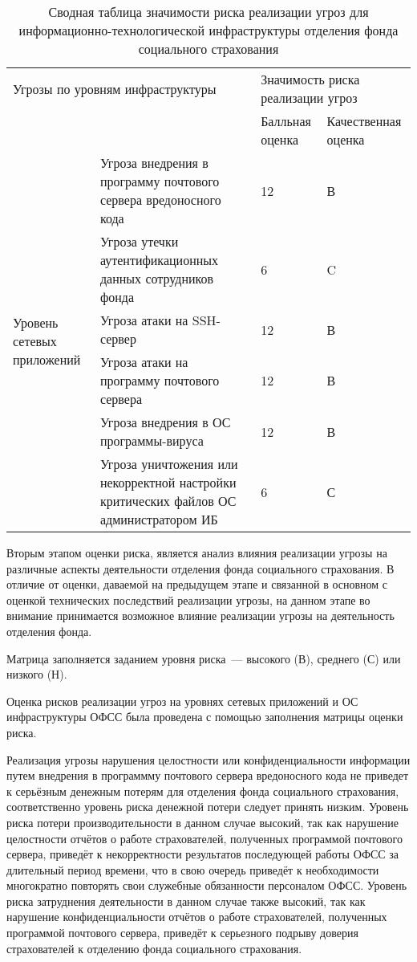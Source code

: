 \begin{table}[h]
  \caption{Сводная таблица значимости риска реализации угроз для информационно-технологической инфраструктуры отделения фонда социального страхования}
  \label{tab:res_risk}
\small
  \begin{tabular}{|p{2.5cm}|p{7cm}|p{2cm}|p{2cm}|}
    \hline
    \multicolumn{2}{|p{9.5cm}}{Угрозы по уровням инфраструктуры} &
    \multicolumn{2}{|p{5cm}|}{Значимость риска реализации угроз}\\\cline{3-4}
    \multicolumn{2}{|p{9.5cm}|}{} & Балльная оценка & Качественная оценка\\\hline
    \multirow{7}{2.5cm}{Уровень сетевых приложений} & Угроза внедрения в программу почтового сервера вредоносного
    кода & 12 & В \\\cline{2-4}
    & Угроза утечки аутентификационных данных сотрудников фонда & 6 &
    C \\\cline{2-4}
    & Угроза атаки на SSH-сервер & 12 & В \\\cline{2-4}
    & Угроза атаки на программу почтового сервера & 12 & В
    \\\hline
    \multirow{5}{2.5cm}{Уровень операционных систем} & Угроза
    внедрения в ОС программы-вируса & 12 & В \\\cline{2-4}
    & Угроза уничтожения или некорректной настройки критических файлов
  ОС администратором ИБ & 6 & С \\\hline
  \end{tabular}
\end{table}
\normalsize

\point Вторым этапом оценки риска, является анализ влияния реализации
угрозы на различные аспекты деятельности отделения фонда социального
страхования.  В отличие от оценки, даваемой на предыдущем этапе и
связанной в основном с оценкой технических последствий реализации
угрозы, на данном этапе во внимание принимается возможное влияние
реализации угрозы на деятельность отделения фонда.

Матрица заполняется заданием уровня риска~--- высокого (В), среднего
(С) или низкого (Н).

\point Оценка рисков реализации угроз на уровнях сетевых приложений и
ОС инфраструктуры ОФСС была проведена с помощью заполнения матрицы
оценки риска.

\point Реализация угрозы нарушения целостности или конфиденциальности
информации путем внедрения в программму почтового сервера вредоносного
кода не приведет к серьёзным денежным потерям для отделения фонда
социального страхования, соответственно уровень риска денежной потери
следует принять низким. Уровень риска потери производительности в
данном случае высокий, так как нарушение целостности отчётов о работе
страхователей, полученных программой почтового сервера, приведёт к
некорректности результатов последующей работы ОФСС за длительный
период времени, что в свою очередь приведёт к необходимости
многократно повторять свои служебные обязанности персоналом
ОФСС. Уровень риска затруднения деятельности в данном случае также
высокий, так как нарушение конфиденциальности отчётов о работе
страхователей, полученных программой почтового сервера, приведёт к
серьезного подрыву доверия страхователей к отделению фонда социального
страхования.

